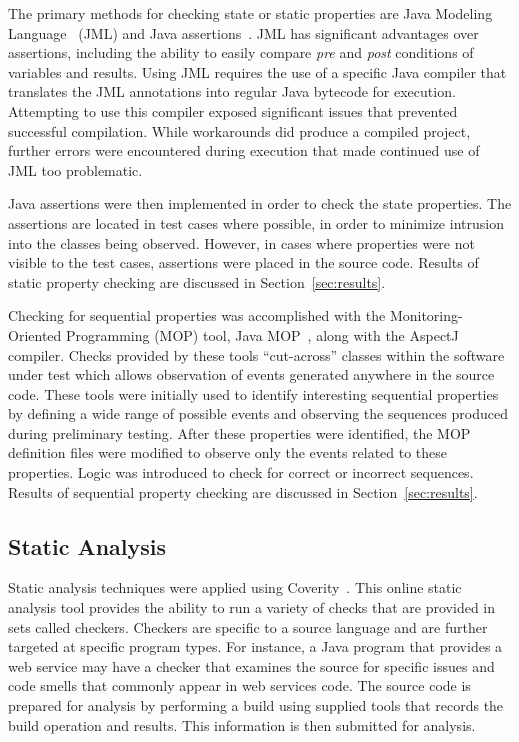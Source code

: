 \documentclass[letterpaper,sigplan]{acmart}
\begin{document}
The primary methods for checking state or static properties are Java Modeling
Language~\cite{openjml} (JML) and Java
assertions~\cite{oracle-java-assertions}.  JML has significant advantages over
assertions, including the ability to easily compare \textit{pre} and
\textit{post} conditions of variables and results.  Using JML requires the use
of a specific Java compiler that translates the JML annotations into regular
Java bytecode for execution.  Attempting to use this compiler exposed
significant issues that prevented successful compilation.  While workarounds
did produce a compiled project, further errors were encountered during
execution that made continued use of JML too problematic.

Java assertions were then implemented in order to check the state properties.
The assertions are located in test cases where possible, in order to minimize
intrusion into the classes being observed.  However, in cases where properties
were not visible to the test cases, assertions were placed in the source code.
Results of static property checking are discussed in Section~\ref{sec:results}.

Checking for sequential properties was accomplished with the
Monitoring-Oriented Programming (MOP) tool, Java MOP~\cite{javamop}, along with
the AspectJ~\cite{eclipse-aspectj} compiler.  Checks provided by these tools
``cut-across'' classes within the software under test which allows observation
of events generated anywhere in the source code. These tools were initially
used to identify interesting sequential properties by defining a wide range of
possible events and observing the sequences produced during preliminary
testing.  After these properties were identified, the MOP definition files were
modified to observe only the events related to these properties.  Logic was
introduced to check for correct or incorrect sequences.  Results of sequential
property checking are discussed in Section~\ref{sec:results}.

\subsection{Static Analysis}

Static analysis techniques were applied using
Coverity~\cite{coverity-scan}.  This online static analysis tool provides the
ability to run a variety of checks that are provided in sets called
checkers.  Checkers are specific to a source language and are further targeted
at specific program types.  For instance, a Java program that provides a web
service may have a checker that examines the source for specific issues and
code smells that commonly appear in web services code.  The source code is
prepared for analysis by performing a build using supplied tools that records
the build operation and results.  This information is then submitted for
analysis.
\end{document}
